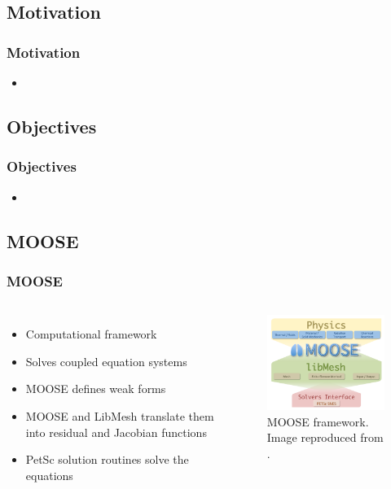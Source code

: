\subsection{Motivation}

\begin{frame}
\frametitle{Motivation}
  \begin{itemize}
    \item 
  \end{itemize}
\end{frame}


\subsection{Objectives}

\begin{frame}
\frametitle{Objectives}
  \begin{itemize}
    \item 
  \end{itemize}
\end{frame}


\subsection{MOOSE}

\begin{frame}
\frametitle{MOOSE}
\begin{columns}
    \column[t]{4cm}
	\begin{itemize}
    	\item Computational framework
    	\item Solves coupled equation systems
    	\item MOOSE defines weak forms
    	\item MOOSE and LibMesh translate them into residual and Jacobian functions
    	\item PetSc solution routines solve the equations
    \end{itemize}

	\column[t]{6cm}
	\begin{figure}[htbp!]
		\begin{center}
			\includegraphics[width=6cm]{figures/moose}
		\end{center}
		\caption{MOOSE framework. Image reproduced from \cite{inl_workshop_2020}.}
	\end{figure}
\end{columns}
\end{frame}
